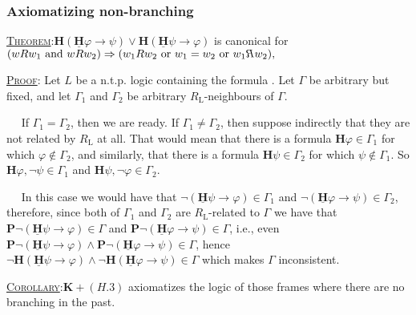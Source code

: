 \documentclass[xcolor=x11names]{beamer}
\newcommand{\dzsa}[1]{\textsc{\underline{#1}}:}
\newcommand{\bemph}[1] {{\color{DeepSkyBlue3}{#1}}}
\newcommand{\PD}{\mathbf P}
\newcommand{\PB}{\mathbf H}
\newcommand{\PBDot}{\underline{\mathbf H}}
\newcommand{\lthen}{\rightarrow}
\newcommand{\seenby}{\reflectbox {$R$}}
\begin{document}
\begin{frame}[t]
\frametitle{Axiomatizing non-branching}
\footnotesize
\dzsa{Theorem}$ \PB (\PBDot \varphi \lthen \psi) \lor \PB (\PBDot \psi \lthen \varphi)$  is canonical for $( w Rw_1\textup{ and }w R w_2) \Rightarrow  (w_1 R w_2 \textup{ or } w_1 =  w_2 \textup{ or } w_1 \seenby w_2),$

\bigskip

\dzsa{Proof} Let $L$ be a n.t.p. logic containing the formula \bemph{(H.3)}.
Let $\Gamma$ be arbitrary but fixed, and let $\Gamma_1$ and $\Gamma_2$ be arbitrary $R_{\mathrm{L}}$-neighbours of $\Gamma$.

$\quad$ If $\Gamma_1=\Gamma_2$, then we are ready.
If $\Gamma_1\neq\Gamma_2$, then suppose indirectly that they are not related by $R_{\mathrm{L}}$ at all. That would mean that there is a formula $\PB \varphi\in \Gamma_1$ for which $\varphi \notin \Gamma_2$, and similarly, that there is a formula $\PB \psi\in \Gamma_2$ for which $\psi \notin \Gamma_1$. So $\PB \varphi, \lnot \psi \in \Gamma_1$ and $\PB \psi, \lnot \varphi \in \Gamma_2$.

$\quad$ In this case we would have that $\lnot(\PBDot \psi \lthen \varphi)\in \Gamma_1$ and $\lnot(\PBDot\varphi \lthen \psi)\in \Gamma_2 $, therefore, since both of $\Gamma_1$ and $\Gamma_2$ are $R_{\mathrm{L}}$-related to $\Gamma$ we have that $\PD\lnot(\PBDot \psi \lthen \varphi)\in \Gamma$ and $\PD  \lnot(\PBDot \varphi \lthen \psi)\in \Gamma$, i.e., even $\PD \lnot(\PBDot \psi \lthen \varphi)\land \PD \lnot(\PBDot \varphi \lthen \psi)\in \Gamma$, hence
$\lnot \PB (\PBDot \psi \lthen \varphi)\land \lnot \PB (\PBDot \varphi \lthen \psi)\in \Gamma$ which makes $\Gamma$ inconsistent.

\dzsa{Corollary}$\mathbf K + (H.3)$ axiomatizes the logic of those frames where there are no branching in the past.
\end{frame}
\end{document}
